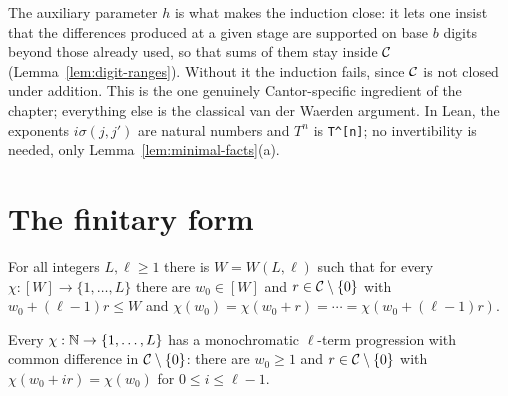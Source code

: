 \begin{remark}
  The auxiliary parameter $h$ is what makes the induction close: it lets one insist that the
  differences produced at a given stage are supported on base $b$ digits beyond those already
  used, so that sums of them stay inside $\mathcal{C}$ (Lemma~\ref{lem:digit-ranges}).  Without it
  the induction fails, since $\mathcal{C}$ is not closed under addition.  This is the one genuinely
  Cantor-specific ingredient of the chapter; everything else is the classical van der Waerden
  argument.  In Lean, the exponents $i\sigma(j,j')$ are natural numbers and $T^{n}$ is
  \texttt{T\^{}[n]}; no invertibility is needed, only Lemma~\ref{lem:minimal-facts}(a).
\end{remark}

\section{The finitary form}

\begin{corollary}
  \label{cor:vdw-finitary}
  \leanok
  For all integers $L, \ell \geq 1$ there is $W = W(L,\ell)$ such that for every
  $\chi : [W] \to \{1,\dots,L\}$ there are $w_0 \in [W]$ and $r \in \mathcal{C}\setminus\{0\}$ with
  $w_0 + (\ell-1)r \leq W$ and $\chi(w_0) = \chi(w_0+r) = \cdots = \chi(w_0+(\ell-1)r)$.
\end{corollary}

\begin{lemma}
  \label{lem:vdw-infinite}
  \leanok
  Every $\chi : \mathbb{N} \to \{1,\dots,L\}$ has a monochromatic $\ell$-term progression with common
  difference in $\mathcal{C}\setminus\{0\}$: there are $w_0 \geq 1$ and $r \in \mathcal{C}\setminus\{0\}$
  with $\chi(w_0 + ir) = \chi(w_0)$ for $0 \leq i \leq \ell - 1$.
\end{lemma}

